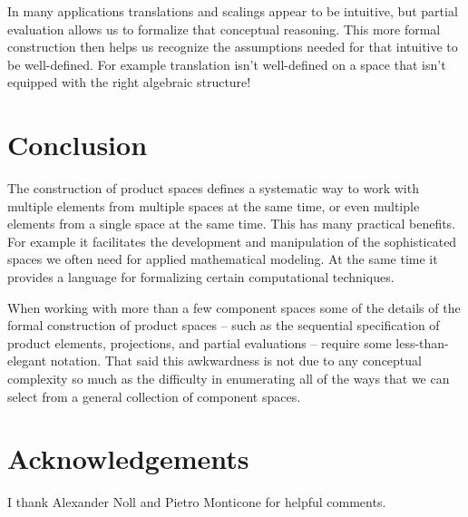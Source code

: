 \documentclass[
  letterpaper,
  DIV=11,
  numbers=noendperiod]{scrartcl}
\begin{document}
In many applications translations and scalings appear to be intuitive,
but partial evaluation allows us to formalize that conceptual reasoning.
This more formal construction then helps us recognize the assumptions
needed for that intuitive to be well-defined. For example translation
isn't well-defined on a space that isn't equipped with the right
algebraic structure!

\hypertarget{conclusion}{%
\section{Conclusion}\label{conclusion}}

The construction of product spaces defines a systematic way to work with
multiple elements from multiple spaces at the same time, or even
multiple elements from a single space at the same time. This has many
practical benefits. For example it facilitates the development and
manipulation of the sophisticated spaces we often need for applied
mathematical modeling. At the same time it provides a language for
formalizing certain computational techniques.

When working with more than a few component spaces some of the details
of the formal construction of product spaces -- such as the sequential
specification of product elements, projections, and partial evaluations
-- require some less-than-elegant notation. That said this awkwardness
is not due to any conceptual complexity so much as the difficulty in
enumerating all of the ways that we can select from a general collection
of component spaces.

\hypertarget{acknowledgements}{%
\section*{Acknowledgements}\label{acknowledgements}}

I thank Alexander Noll and Pietro Monticone for helpful comments.
\end{document}

